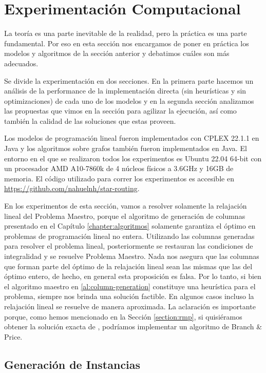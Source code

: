 \chapter{Experimentación Computacional}
\label{ch:experiments}

La teoría es una parte inevitable de la realidad, pero la práctica es una parte fundamental. Por eso en esta sección nos encargamos de poner en práctica los modelos y algoritmos de la sección anterior y debatimos cuáles son más adecuados. 

Se divide la experimentación en dos secciones. En la primera parte hacemos un análisis de la performance de la implementación directa (sin heurísticas y sin optimizaciones) de cada uno de los modelos y en la segunda sección analizamos las propuestas que vimos en la sección \label{ch:algoritmos} para agilizar la ejecución, así como también la calidad de las soluciones que estas proveen.

Los modelos de programación lineal fueron implementados con CPLEX 22.1.1 en Java y los algoritmos sobre grafos también fueron implementados en Java. El entorno en el que se realizaron todos los experimentos es Ubuntu 22.04 64-bit con un procesador AMD A10-7860k de 4 núcleos físicos a 3.6GHz y 16GB de memoria.
El código utilizado para correr los experimentos es accesible en \url{https://github.com/nahuelnh/star-routing}.

En los experimentos de esta sección, vamos a resolver solamente la relajación lineal del Problema Maestro, porque el algoritmo de generación de columnas presentado en el Capítulo \ref{chapter:algoritmos} solamente garantiza el óptimo en problemas de programación lineal no entera. Utilizando las columnas generadas para resolver el problema lineal, posteriormente se restauran las condiciones de integralidad y se resuelve Problema Maestro. Nada nos asegura que las columnas que forman parte del óptimo de la relajación lineal sean las mismas que las del óptimo entero, de hecho, en general esta proposición es falsa. Por lo tanto, si bien el algoritmo maestro en \ref{al:column-generation} constituye una heurística para el problema, siempre nos brinda una solución factible. En algunos casos incluso la relajación lineal se resuelve de manera aproximada. La aclaración es importante porque, como hemos mencionado en la Sección \ref{section:rmp}, si quisiéramos obtener la solución exacta de , podríamos implementar un algoritmo de Branch \& Price. 


\section{Generación de Instancias}

